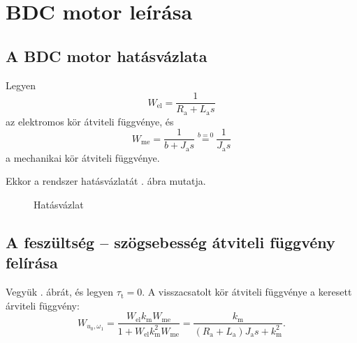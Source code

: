 \section{BDC motor leírása}

\subsection{A BDC motor hatásvázlata}

Legyen
\begin{equation}
	W_\text{el} = \frac{1}{R_\text{a} + L_\text{a}s}
\end{equation}
az elektromos kör átviteli függvénye, és
\begin{equation}
	W_\text{me} = \frac{1}{b + J_\text{a}s} \overset{b=0}{=} \frac{1}{J_\text{a}s}
\end{equation}
a mechanikai kör átviteli függvénye.

Ekkor a rendszer hatásvázlatát . ábra mutatja.

\begin{figure}[h]
	\centering
	\caption{Hatásvázlat}
	\label{fig:hatasvazlat}
\end{figure}

\subsection{A feszültség -- szögsebesség átviteli függvény felírása}

Vegyük . ábrát, és legyen $\tau_\text{t}=0$.
A visszacsatolt kör átviteli függvénye a keresett árviteli függvény:
\begin{equation}
	W_{u_0,\omega_1} =
	\frac{W_\text{el}k_\text{m}W_\text{me}}{1+W_\text{el}k_\text{m}^2W_\text{me}} =
	\frac{k_\text{m}}{(R_\text{a}+L_\text{a})J_\text{a}s+k_\text{m}^2}.
\end{equation}
